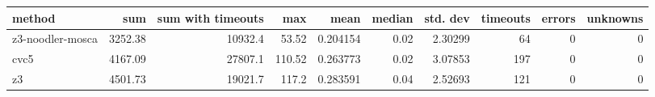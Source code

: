 \begin{tabular}{lrrrrrrrrr}
\hline
 method           &     sum &   sum with timeouts &    max &     mean &   median &   std. dev &   timeouts &   errors &   unknowns \\
\hline
 z3-noodler-mosca & 3252.38 &             10932.4 &  53.52 & 0.204154 &     0.02 &    2.30299 &         64 &        0 &          0 \\
 cvc5             & 4167.09 &             27807.1 & 110.52 & 0.263773 &     0.02 &    3.07853 &        197 &        0 &          0 \\
 z3               & 4501.73 &             19021.7 & 117.2  & 0.283591 &     0.04 &    2.52693 &        121 &        0 &          0 \\
\hline
\end{tabular}
